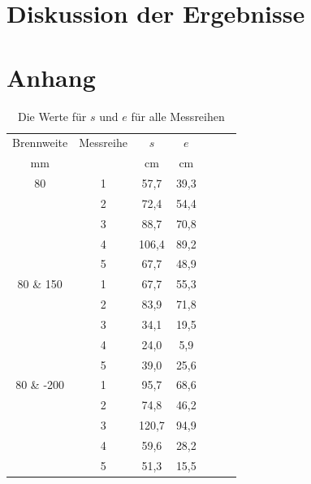 \documentclass[11pt,a4paper]{article}
\begin{document}
\section{Diskussion der Ergebnisse}

\section{Anhang}


\begin{table}[h]
	\centering
	\begin{tabular*}{0.50\textwidth}{@{\extracolsep{\fill}}cc|ccccc}
		\toprule
		Brennweite & Messreihe & $s$ & $e$   \\
		mm &  & cm & cm  \\
		\bottomrule
		80 & 1 & 57,7 & 39,3 \\
		& 2 & 72,4 & 54,4 \\
		& 3 & 88,7 & 70,8 \\
		& 4 & 106,4 & 89,2 \\
		& 5 & 67,7 & 48,9 \\
		80 \& 150 & 1 & 67,7 & 55,3 \\
		& 2 & 83,9 & 71,8 \\
		& 3 & 34,1 & 19,5 \\
		& 4 & 24,0 & 5,9 \\
		& 5 & 39,0 & 25,6 \\
		80 \& -200 & 1 & 95,7 & 68,6 \\
		& 2 & 74,8 & 46,2 \\
		& 3 & 120,7 & 94,9 \\
		& 4 & 59,6 & 28,2 \\
		& 5 & 51,3 & 15,5 \\
		\bottomrule
	\end{tabular*}
	\caption{Die Werte für $s$ und $e$ für alle Messreihen}
\end{table}
\end{document}
